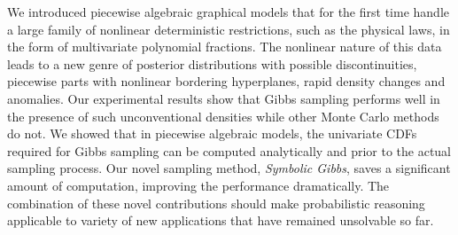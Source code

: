 \documentclass[]{article}
\begin{document}
We introduced piecewise algebraic graphical models that for the first time handle a large family of nonlinear deterministic restrictions, such as the physical laws, in the form of multivariate polynomial fractions. The nonlinear nature of this data leads to a new genre of posterior distributions with possible discontinuities, 
piecewise parts with nonlinear bordering hyperplanes, rapid density changes and anomalies. Our experimental results show that Gibbs sampling performs well in the presence of such unconventional densities while other Monte Carlo methods do not. We showed that in piecewise algebraic models, the univariate CDFs required for Gibbs sampling can be computed analytically and prior to the actual sampling process. Our novel sampling method, \emph{Symbolic Gibbs}, saves a significant amount of computation, improving the performance dramatically. The combination of these novel contributions should make probabilistic reasoning applicable to variety of new applications that have remained unsolvable so far.      




\end{document}
